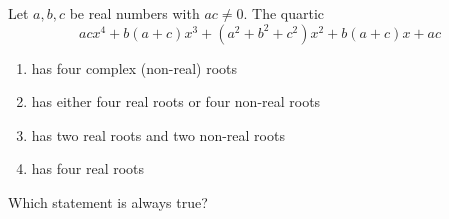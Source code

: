 Let $a,b,c$ be real numbers with $ac\ne0$. The quartic
\[acx^4+b(a+c)x^3+\left(a^2+b^2+c^2\right)x^2+b(a+c)x+ac\]
\begin{enumerate}
\item[(A)] has four complex (non-real) roots
\item[(B)] has either four real roots or four non-real roots
\item[(C)] has two real roots and two non-real roots
\item[(D)] has four real roots
\end{enumerate}
Which statement is always true?
